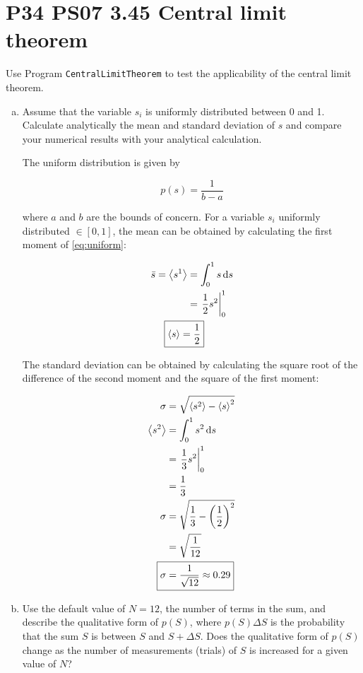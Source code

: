 \documentclass[9pt,a4paper,twocolumn]{article}
\begin{document}
\section{P34 PS07 3.45 Central limit theorem}
Use Program \texttt{CentralLimitTheorem} to test the applicability of the central limit theorem.

\begin{enumerate}[(a)]

\item Assume that the variable $s_i$ is uniformly distributed between 0 and 1. Calculate analytically the mean and standard deviation of $s$ and compare your numerical results with your analytical calculation.

The uniform distribution is given by

\begin{equation}\label{eq:uniform}
	p(s) = \frac{1}{b-a}
\end{equation}

where $a$ and $b$ are the bounds of concern. For a variable $s_i$ uniformly distributed $\in [0,1]$, the mean can be obtained by calculating the first moment of \eqref{eq:uniform}:

\begin{align}
	\bar{s} = \ev{s^1} &= \int_0^1 s \dd{s} \\
	&= \eval{\frac{1}{2}s^2}_0^1 \nonumber \\
	\Aboxed{
		\ev{s} &= \frac{1}{2} \label{eq:answer-a-mean}
	}
\end{align}

The standard deviation can be obtained by calculating the square root of the difference of the second moment and the square of the first moment:

\begin{align}
	\sigma &= \sqrt{\ev{s^2} - \ev{s}^2} \label{eq:variance} \\
	\ev{s^2} &= \int_0^1 s^2 \dd{s} \\
	&= \eval{\frac{1}{3}s^2}_0^1 \nonumber \\
	&= \frac{1}{3} \\
	\sigma &= \sqrt{\frac{1}{3} - \qty(\frac{1}{2})^2} \nonumber \\
	&= \sqrt{\frac{1}{12}} \nonumber \\
	\Aboxed{
		\sigma &= \frac{1}{\sqrt{12}} \approx 0.29
	} \label{eq:answer-a-sd}
\end{align}

\item Use the default value of $N = 12$, the number of terms in the sum, and describe the qualitative form of $p(S)$, where $p(S)\Delta S$ is the probability that the sum $S$ is between $S$ and $S +\Delta S$. Does the qualitative form of $p(S)$ change as the number of measurements (trials) of $S$ is increased for a given value of $N$?


\end{enumerate}
\end{document}
